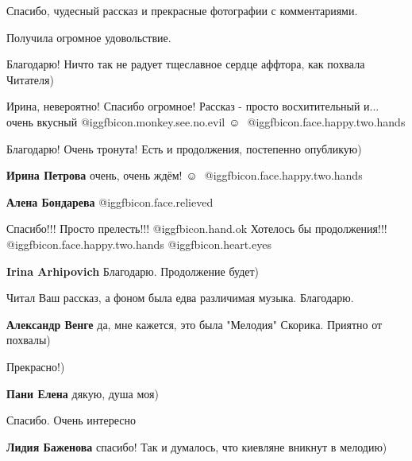 \begin{itemize}
Спасибо, чудесный рассказ и прекрасные фотографии с комментариями.

Получила огромное удовольствие.

\begin{itemize} %
Благодарю! Ничто так не радует тщеславное сердце аффтора, как похвала Читателя)
\end{itemize} %

Ирина, невероятно! Спасибо огромное! Рассказ - просто восхитительный и... очень вкусный  @igg{fbicon.monkey.see.no.evil}  ☺ ️  @igg{fbicon.face.happy.two.hands} 

\begin{itemize} %
Благодарю! Очень тронута! Есть и продолжения, постепенно опубликую)

\textbf{Ирина Петрова} очень, очень ждём!  ☺ ️  @igg{fbicon.face.happy.two.hands} 

\textbf{Алена Бондарева}  @igg{fbicon.face.relieved} 
\end{itemize} %

Спасибо!!! Просто прелесть!!!  @igg{fbicon.hand.ok} Хотелось бы продолжения!!!  @igg{fbicon.face.happy.two.hands}  @igg{fbicon.heart.eyes} 

\begin{itemize} %
\textbf{Irina Arhipovich} Благодарю. Продолжение будет)
\end{itemize} %

Читал Ваш рассказ, а фоном была едва различимая музыка. Благодарю.

\begin{itemize} %
\textbf{Александр Венге} да, мне кажется, это была "Мелодия" Скорика. Приятно от похвалы)
\end{itemize} %

Прекрасно!)

\begin{itemize} %
\textbf{Пани Елена} дякую, душа моя)
\end{itemize} %

Спасибо. Очень интересно

\begin{itemize} %
\textbf{Лидия Баженова} спасибо! Так и думалось, что киевляне вникнут в мелодию)
\end{itemize} %


\end{itemize}
